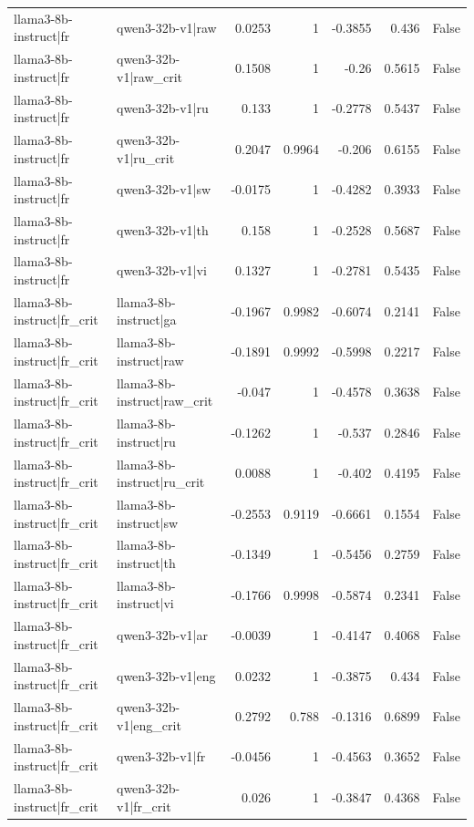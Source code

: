 \begin{table}
\begin{tabular}{l l r r r r l}
llama3-8b-instruct|fr & qwen3-32b-v1|raw & 0.0253 & 1 & -0.3855 & 0.436 & False \\
llama3-8b-instruct|fr & qwen3-32b-v1|raw_crit & 0.1508 & 1 & -0.26 & 0.5615 & False \\
llama3-8b-instruct|fr & qwen3-32b-v1|ru & 0.133 & 1 & -0.2778 & 0.5437 & False \\
llama3-8b-instruct|fr & qwen3-32b-v1|ru_crit & 0.2047 & 0.9964 & -0.206 & 0.6155 & False \\
llama3-8b-instruct|fr & qwen3-32b-v1|sw & -0.0175 & 1 & -0.4282 & 0.3933 & False \\
llama3-8b-instruct|fr & qwen3-32b-v1|th & 0.158 & 1 & -0.2528 & 0.5687 & False \\
llama3-8b-instruct|fr & qwen3-32b-v1|vi & 0.1327 & 1 & -0.2781 & 0.5435 & False \\
llama3-8b-instruct|fr_crit & llama3-8b-instruct|ga & -0.1967 & 0.9982 & -0.6074 & 0.2141 & False \\
llama3-8b-instruct|fr_crit & llama3-8b-instruct|raw & -0.1891 & 0.9992 & -0.5998 & 0.2217 & False \\
llama3-8b-instruct|fr_crit & llama3-8b-instruct|raw_crit & -0.047 & 1 & -0.4578 & 0.3638 & False \\
llama3-8b-instruct|fr_crit & llama3-8b-instruct|ru & -0.1262 & 1 & -0.537 & 0.2846 & False \\
llama3-8b-instruct|fr_crit & llama3-8b-instruct|ru_crit & 0.0088 & 1 & -0.402 & 0.4195 & False \\
llama3-8b-instruct|fr_crit & llama3-8b-instruct|sw & -0.2553 & 0.9119 & -0.6661 & 0.1554 & False \\
llama3-8b-instruct|fr_crit & llama3-8b-instruct|th & -0.1349 & 1 & -0.5456 & 0.2759 & False \\
llama3-8b-instruct|fr_crit & llama3-8b-instruct|vi & -0.1766 & 0.9998 & -0.5874 & 0.2341 & False \\
llama3-8b-instruct|fr_crit & qwen3-32b-v1|ar & -0.0039 & 1 & -0.4147 & 0.4068 & False \\
llama3-8b-instruct|fr_crit & qwen3-32b-v1|eng & 0.0232 & 1 & -0.3875 & 0.434 & False \\
llama3-8b-instruct|fr_crit & qwen3-32b-v1|eng_crit & 0.2792 & 0.788 & -0.1316 & 0.6899 & False \\
llama3-8b-instruct|fr_crit & qwen3-32b-v1|fr & -0.0456 & 1 & -0.4563 & 0.3652 & False \\
llama3-8b-instruct|fr_crit & qwen3-32b-v1|fr_crit & 0.026 & 1 & -0.3847 & 0.4368 & False \\

\end{tabular}
\end{table}
